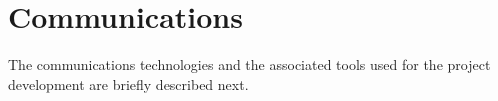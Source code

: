 \section{Communications}
The communications technologies and the associated tools used for the project development are briefly described next.
%

%


%

%

